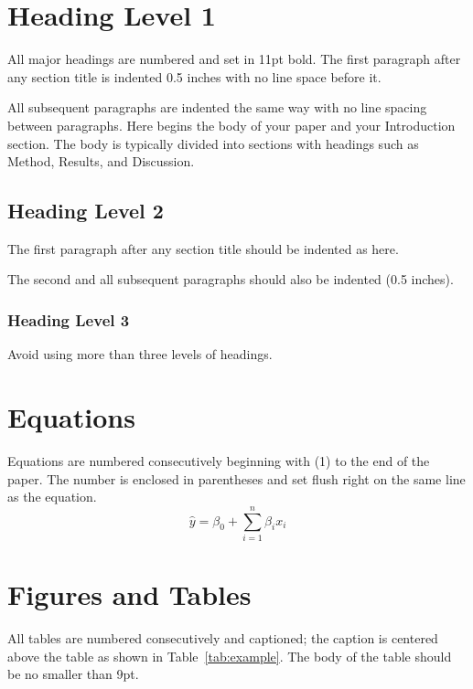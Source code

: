 \documentclass[10pt,letterpaper]{article}
\begin{document}
\section{Heading Level 1}

All major headings are numbered and set in 11pt bold. The first paragraph after any
section title is indented 0.5 inches with no line space before it.

All subsequent paragraphs are indented the same way with no line spacing between
paragraphs. Here begins the body of your paper and your Introduction section. The body is
typically divided into sections with headings such as Method, Results, and Discussion.

\subsection{Heading Level 2}

The first paragraph after any section title should be indented as here.

The second and all subsequent paragraphs should also be indented (0.5 inches).

\subsubsection{Heading Level 3}

Avoid using more than three levels of headings.

\section{Equations}

Equations are numbered consecutively beginning with (1) to the end of the paper. The number
is enclosed in parentheses and set flush right on the same line as the equation.
\begin{equation}
  \hat{y} = \beta_0 + \sum_{i=1}^{n} \beta_i x_i
\end{equation}

\section{Figures and Tables}

All tables are numbered consecutively and captioned; the caption is centered above the
table as shown in Table~\ref{tab:example}. The body of the table should be no smaller than
9pt.
\end{document}
